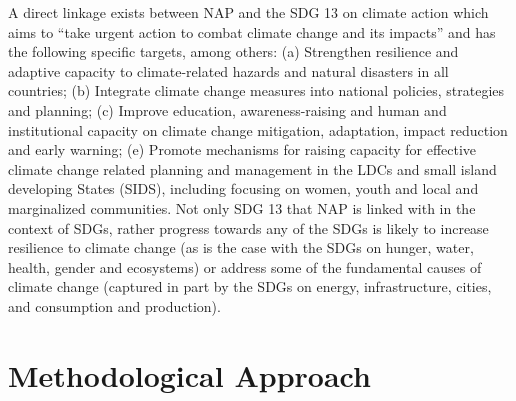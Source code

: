 \documentclass[
]{book}
\begin{document}
\begin{enumerate}
  A direct linkage exists between NAP and the SDG 13 on climate action which aims to ``take urgent action to combat climate change and its impacts'' and has the following specific targets, among others: (a) Strengthen resilience and adaptive capacity to climate-related hazards and natural disasters in all countries; (b) Integrate climate change measures into national policies, strategies and planning; (c) Improve education, awareness-raising and human and institutional capacity on climate change mitigation, adaptation, impact reduction and early warning; (e) Promote mechanisms for raising capacity for effective climate change related planning and management in the LDCs and small island developing States (SIDS), including focusing on women, youth and local and marginalized communities. Not only SDG 13 that NAP is linked with in the context of SDGs, rather progress towards any of the SDGs is likely to increase resilience to climate change (as is the case with the SDGs on hunger, water, health, gender and ecosystems) or address some of the fundamental causes of climate change (captured in part by the SDGs on energy, infrastructure, cities, and consumption and production).
\end{enumerate}

\hypertarget{methodological-approach}{%
\section{Methodological Approach}\label{methodological-approach}}
\end{document}
